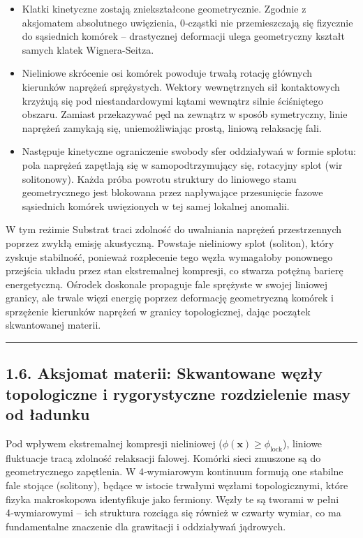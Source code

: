\documentclass[
  letterpaper,
  DIV=11,
  numbers=noendperiod]{scrartcl}
\providecommand{\tightlist}{%
  \setlength{\itemsep}{0pt}\setlength{\parskip}{0pt}}
\numberwithin{equation}{subsection}
\begin{document}
\begin{itemize}
\tightlist
\item
  Klatki kinetyczne zostają zniekształcone geometrycznie. Zgodnie z
  aksjomatem absolutnego uwięzienia, 0‑cząstki nie przemieszczają się
  fizycznie do sąsiednich komórek -- drastycznej deformacji ulega
  geometryczny kształt samych klatek Wignera-Seitza.
\item
  Nieliniowe skrócenie osi komórek powoduje trwałą rotację głównych
  kierunków naprężeń sprężystych. Wektory wewnętrznych sił kontaktowych
  krzyżują się pod niestandardowymi kątami wewnątrz silnie ściśniętego
  obszaru. Zamiast przekazywać pęd na zewnątrz w sposób symetryczny,
  linie naprężeń zamykają się, uniemożliwiając prostą, liniową
  relaksację fali.
\item
  Następuje kinetyczne ograniczenie swobody sfer oddziaływań w formie
  splotu: pola naprężeń zapętlają się w samopodtrzymujący się, rotacyjny
  splot (wir solitonowy). Każda próba powrotu struktury do liniowego
  stanu geometrycznego jest blokowana przez napływające przesunięcie
  fazowe sąsiednich komórek uwięzionych w tej samej lokalnej anomalii.
\end{itemize}

W tym reżimie Substrat traci zdolność do uwalniania naprężeń
przestrzennych poprzez zwykłą emisję akustyczną. Powstaje nieliniowy
splot (soliton), który zyskuje stabilność, ponieważ rozplecenie tego
węzła wymagałoby ponownego przejścia układu przez stan ekstremalnej
kompresji, co stwarza potężną barierę energetyczną. Ośrodek doskonale
propaguje fale sprężyste w swojej liniowej granicy, ale trwale więzi
energię poprzez deformację geometryczną komórek i sprzężenie kierunków
naprężeń w granicy topologicznej, dając początek skwantowanej materii.

\begin{center}\rule{0.5\linewidth}{0.5pt}\end{center}

\subsection{1.6. Aksjomat materii: Skwantowane węzły topologiczne i
rygorystyczne rozdzielenie masy od
ładunku}\label{aksjomat-materii-skwantowane-wux119zux142y-topologiczne-i-rygorystyczne-rozdzielenie-masy-od-ux142adunku}

Pod wpływem ekstremalnej kompresji nieliniowej
(\(\phi(\mathbf{x}) \ge \phi_{\text{lock}}\)), liniowe fluktuacje tracą
zdolność relaksacji falowej. Komórki sieci zmuszone są do geometrycznego
zapętlenia. W 4‑wymiarowym kontinuum formują one stabilne fale stojące
(solitony), będące w istocie trwałymi węzłami topologicznymi, które
fizyka makroskopowa identyfikuje jako fermiony. Węzły te są tworami w
pełni 4‑wymiarowymi -- ich struktura rozciąga się również w czwarty
wymiar, co ma fundamentalne znaczenie dla grawitacji i oddziaływań
jądrowych.
\end{document}
